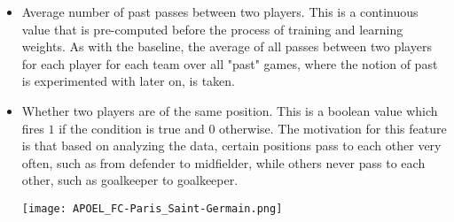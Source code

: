 \documentclass[11pt,letterpaper]{article}
\begin{document}
\begin{itemize}
\item Average number of past passes between two players. This is a continuous value that is pre-computed before the process of training and learning weights. As with the baseline, the average of all passes between two players for each player for each team over all "past" games, where the notion of past is experimented with later on, is taken.
\item Whether two players are of the same position. This is a boolean value which fires $1$ if the condition is true and $0$ otherwise. The motivation for this feature is that based on analyzing the data, certain positions pass to each other very often, such as from defender to midfielder, while others never pass to each other, such as goalkeeper to goalkeeper.

\texttt{[image: APOEL\_FC-Paris\_Saint-Germain.png]}


\end{itemize}
\end{document}
